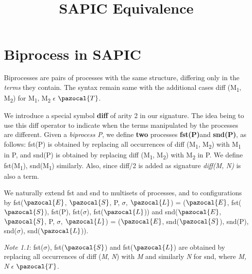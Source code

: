 \documentclass[11pt]{article}
\title{SAPIC Equivalence}
\newcommand{\Sa}{\pazocal{S}}
\newcommand{\Lb}{\pazocal{L}}
\newcommand{\Ea}{\pazocal{E}}
\newcommand{\Ta}{\pazocal{T}}
\begin{document}

\section{Biprocess in SAPIC}

Biprocesses are pairs of processes with the same structure, differing only in the {\it terms} they contain.  The syntax remain same with the additional cases diff (M\textsubscript{1}, M\textsubscript{2}) for M\textsubscript{1}, M\textsubscript{2} $\epsilon$ $\Ta$. 
\newline

We introduce a special symbol {\bf diff} of arity 2 in our signature. The idea being to use this diff operator to indicate when the terms manipulated by the processes are different. Given a {\it biprocess P}, we define {\bf two} processes {\bf fst(P)}and {\bf snd(P)}, as follows: fst(P) is obtained by replacing all occurrences of diff (M\textsubscript{1}, M\textsubscript{2}) with M\textsubscript{1} in P, and snd(P) is obtained by replacing diff (M\textsubscript{1}, M\textsubscript{2}) with M\textsubscript{2} in P. We define fst(M\textsubscript{1}), snd(M\textsubscript{1}) similarly. Also, since diff/2 is added as signature {\it diff(M, N)} is also a term.\newline

We naturally extend fst and snd to multisets of processes, and to configurations \\by fst($\Ea$, $\Sa$, P, $\sigma$, $\Lb$) = ($\Ea$, fst($\Sa$), fst(P), fst($\sigma$), fst($\Lb$)) and snd($\Ea$, $\Sa$, P, $\sigma$, $\Lb$) = ($\Ea$, snd($\Sa$), snd(P), snd($\sigma$), snd($\Lb$)).\newline

{\it Note 1.1}: fst($\sigma$), fst($\Sa$) and fst($\Lb$) are obtained by replacing all occurrences of diff ({\it M}, {\it N}) with {\it M} and similarly {\it N} for snd, where {\it M, N} $\epsilon$ $\Ta$.

\vspace{6pt}
\end{document}
